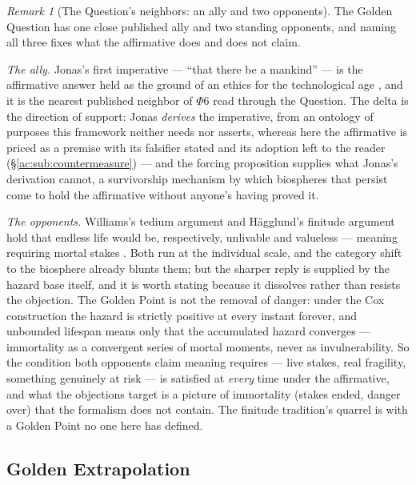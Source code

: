 \documentclass[11pt]{article}
\numberwithin{equation}{section}
\theoremstyle{plain}
\theoremstyle{definition}
\theoremstyle{remark}
\newtheorem{remark}[theorem]{Remark}
\begin{document}
\begin{remark}[The Question's neighbors: an ally and two opponents]
\label{ac:rem:questionneighbors}
The Golden Question has one close published ally and two standing
opponents, and naming all three fixes what the affirmative does and
does not claim.

\emph{The ally.} Jonas's first imperative --- ``that there be a
mankind'' --- is the affirmative answer held as the ground of an
ethics for the technological age \cite{Jonas84}, and it is the
nearest published neighbor of $\Phi6$ read through the Question. The
delta is the direction of support: Jonas \emph{derives} the
imperative, from an ontology of purposes this framework neither needs
nor asserts, whereas here the affirmative is priced as a premise with
its falsifier stated and its adoption left to the reader
(\S\ref{ac:sub:countermeasure}) --- and the forcing proposition
supplies what Jonas's derivation cannot, a survivorship mechanism by
which biospheres that persist come to hold the affirmative without
anyone's having proved it.

\emph{The opponents.} Williams's tedium argument and H\"agglund's
finitude argument hold that endless life would be, respectively,
unlivable and valueless --- meaning requiring mortal stakes
\cite{Wil73,Hag19}. Both run at the individual scale, and the
category shift to the biosphere already blunts them; but the sharper
reply is supplied by the hazard base itself, and it is worth stating
because it dissolves rather than resists the objection. The Golden
Point is not the removal of danger: under the Cox construction the
hazard is strictly positive at every instant forever, and unbounded
lifespan means only that the accumulated hazard converges ---
immortality as a convergent series of mortal moments, never as
invulnerability. So the condition both opponents claim meaning
requires --- live stakes, real fragility, something genuinely at risk
--- is satisfied at \emph{every} time under the affirmative, and what
the objections target is a picture of immortality (stakes ended,
danger over) that the formalism does not contain. The finitude
tradition's quarrel is with a Golden Point no one here has defined.
\end{remark}

\subsection{Golden Extrapolation}\label{ac:sub:extrapolation}
\end{document}
